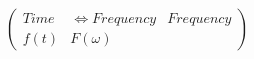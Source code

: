 \documentclass[preview]{standalone}
\begin{document}
\begin{align*}
\left( \begin{array}{rcl} Time & \Longleftrightarrow Frequency & Frequency \\ f(t) & F(\omega) \end{array} \right)
\end{align*}
\end{document}
